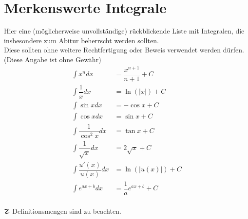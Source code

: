 \documentclass[main.tex]{subfiles}
\begin{document}
\section{Merkenswerte Integrale}
Hier eine (möglicherweise unvollständige) rückblickende Liste mit Integralen, die insbesondere zum Abitur beherrscht werden sollten.\\
Diese sollten ohne weitere Rechtfertigung oder Beweis verwendet werden dürfen. (Diese Angabe ist ohne Gewähr)\\
\begin{align*}
  \int x^n dx &=\dfrac{x^{n+1}}{n+1} + C\\
  \int\dfrac{1}{x} dx &= \ln(|x|) + C\\
  \int\sin x dx &= -\cos x + C\\
  \int\cos x dx &= \sin x + C\\
  \int\dfrac{1}{\cos^2x}dx &= \tan x + C\\
  \int\dfrac{1}{\sqrt{x}}dx &= 2\sqrt{x} + C\\
  \int\dfrac{u'(x)}{u(x)} dx &= \ln(|u(x)|) + C\\
  \int e^{ax+b}dx &= \dfrac{1}{a}e^{ax+b} + C
\end{align*}
\\
$\danger$ Definitionsmengen sind zu beachten.
\end{document}
